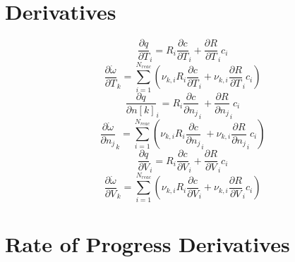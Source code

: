 \documentclass[a4paper,10pt]{article}
\newcommand{\nr}{N_{reac}}
\begin{document}
\section{Derivatives}
\begin{dmath} \frac{\partial q }{\partial T }_{i} = R_{i} \frac{\partial c }{\partial T }_{i} + \frac{\partial R }{\partial T }_{i} c_{i}\end{dmath} 
\begin{dmath} \frac{\partial \dot{\omega} }{\partial T }_{k} = \sum_{i=1}^{\nr} \left(\nu_{k,i} R_{i} \frac{\partial c }{\partial T }_{i} + \nu_{k,i} \frac{\partial R }{\partial T }_{i} c_{i}\right)\end{dmath} 
\begin{dmath} \frac{\partial q }{\partial n[k] }_{i} = R_{i} \frac{\partial c }{\partial {n_j} }_{i} + \frac{\partial R }{\partial {n_j} }_{i} c_{i}\end{dmath} 
\begin{dmath} \frac{\partial \dot{\omega} }{\partial {n_j} }_{k} = \sum_{i=1}^{\nr} \left(\nu_{k,i} R_{i} \frac{\partial c }{\partial {n_j} }_{i} + \nu_{k,i} \frac{\partial R }{\partial {n_j} }_{i} c_{i}\right)\end{dmath} 
\begin{dmath} \frac{\partial q }{\partial V }_{i} = R_{i} \frac{\partial c }{\partial V }_{i} + \frac{\partial R }{\partial V }_{i} c_{i}\end{dmath} 
\begin{dmath} \frac{\partial \dot{\omega} }{\partial V }_{k} = \sum_{i=1}^{\nr} \left(\nu_{k,i} R_{i} \frac{\partial c }{\partial V }_{i} + \nu_{k,i} \frac{\partial R }{\partial V }_{i} c_{i}\right)\end{dmath} 
\section{Rate of Progress Derivatives}
\end{document}
